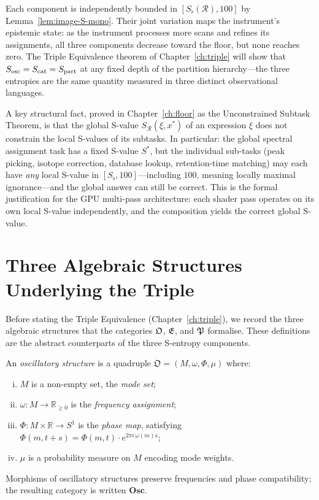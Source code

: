 Each component is independently bounded in $[S_{\flat}(\mathcal{R}), 100]$ by
Lemma~\ref{lem:image-S-mono}.  Their joint variation maps the instrument's
epistemic state: as the instrument processes more scans and refines its
assignments, all three components decrease toward the floor, but none reaches
zero.  The Triple Equivalence theorem of Chapter~\ref{ch:triple} will show
that $S_{\mathrm{osc}} = S_{\mathrm{cat}} = S_{\mathrm{part}}$ at any fixed depth of the partition hierarchy---the
three entropies are the same quantity measured in three distinct observational
languages.

\begin{remark}
A key structural fact, proved in Chapter~\ref{ch:floor} as the Unconstrained
Subtask Theorem, is that the global S-value $S_{\mathcal{R}}(\xi, x^{*})$ of
an expression $\xi$ does not constrain the local S-values of its subtasks.
In particular: the global spectral assignment task has a fixed S-value
$S^{*}$, but the individual sub-tasks (peak picking, isotope correction,
database lookup, retention-time matching) may each have \emph{any} local
S-value in $[S_{\flat}, 100]$---including $100$, meaning locally maximal
ignorance---and the global answer can still be correct.  This is the formal
justification for the GPU multi-pass architecture: each shader pass operates
on its own local S-value independently, and the composition yields the correct
global S-value.
\end{remark}

\section{Three Algebraic Structures Underlying the Triple}
\label{sec:ch13-structures}

Before stating the Triple Equivalence (Chapter~\ref{ch:triple}), we record the
three algebraic structures that the categories $\mathfrak{O}$, $\mathfrak{E}$, and $\mathfrak{P}$
formalise.  These definitions are the abstract counterparts of the three
S-entropy components.

\begin{definition}\label{def:osc-mono}
An \emph{oscillatory structure} is a quadruple
$\mathfrak{O} = (M, \omega, \Phi, \mu)$
where:
\begin{enumerate}[(i)]
  \item $M$ is a non-empty set, the \emph{mode set};
  \item $\omega : M \to \mathbb{R}_{\geq 0}$ is the \emph{frequency
    assignment};
  \item $\Phi : M \times \mathbb{R} \to S^1$ is the \emph{phase map},
    satisfying $\Phi(m, t+s) = \Phi(m,t) \cdot e^{2\pi i\,\omega(m)s}$;
  \item $\mu$ is a probability measure on $M$ encoding mode weights.
\end{enumerate}
Morphisms of oscillatory structures preserve frequencies and phase
compatibility; the resulting category is written $\mathbf{Osc}$.
\end{definition}

